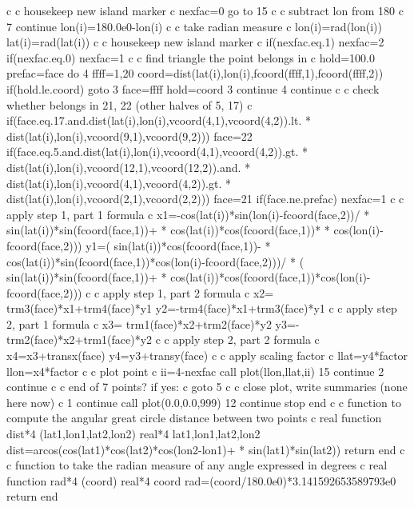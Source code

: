 c
c housekeep new island marker
c
      nexfac=0
      go to 15
c
c subtract lon from 180
c
7     continue
      lon(i)=180.0e0-lon(i)
c
c take radian measure
c
      lon(i)=rad(lon(i))
      lat(i)=rad(lat(i))
c
c housekeep new island marker
c
      if(nexfac.eq.1) nexfac=2
      if(nexfac.eq.0) nexfac=1
c
c find triangle the point belongs in
c
      hold=100.0
      prefac=face
      do 4 ffff=1,20
      coord=dist(lat(i),lon(i),fcoord(ffff,1),fcoord(ffff,2))
      if(hold.le.coord) goto 3
      face=ffff
      hold=coord
3     continue
4     continue
c
c check whether belongs in 21, 22 (other halves of 5, 17)
c
      if(face.eq.17.and.dist(lat(i),lon(i),vcoord(4,1),vcoord(4,2)).lt.
     *  dist(lat(i),lon(i),vcoord(9,1),vcoord(9,2))) face=22
      if(face.eq.5.and.dist(lat(i),lon(i),vcoord(4,1),vcoord(4,2)).gt.
     *  dist(lat(i),lon(i),vcoord(12,1),vcoord(12,2)).and.
     *  dist(lat(i),lon(i),vcoord(4,1),vcoord(4,2)).gt.
     *  dist(lat(i),lon(i),vcoord(2,1),vcoord(2,2))) face=21
      if(face.ne.prefac) nexfac=1
c
c apply step 1, part 1 formula
c
      x1=-cos(lat(i))*sin(lon(i)-fcoord(face,2))/
     *    sin(lat(i))*sin(fcoord(face,1))+
     *    cos(lat(i))*cos(fcoord(face,1))*
     *    cos(lon(i)-fcoord(face,2)))
      y1=( sin(lat(i))*cos(fcoord(face,1))-
     *     cos(lat(i))*sin(fcoord(face,1))*cos(lon(i)-fcoord(face,2)))/
     *   ( sin(lat(i))*sin(fcoord(face,1))+
     *     cos(lat(i))*cos(fcoord(face,1))*cos(lon(i)-fcoord(face,2)))
c
c apply step 1, part 2 formula
c
      x2= trm3(face)*x1+trm4(face)*y1
      y2=-trm4(face)*x1+trm3(face)*y1
c
c apply step 2, part 1 formula
c
      x3= trm1(face)*x2+trm2(face)*y2
      y3=-trm2(face)*x2+trm1(face)*y2
c
c apply step 2, part 2 formula
c
      x4=x3+transx(face)
      y4=y3+transy(face)
c
c apply scaling factor
c
      llat=y4*factor
      llon=x4*factor
c
c plot point
c
      ii=4-nexfac
      call plot(llon,llat,ii)
15    continue
2     continue
c
c end of 7 points? if yes:
c
      goto 5
c
c close plot, write summaries (none here now)
c
1     continue
      call plot(0.0,0.0,999)
12    continue
      stop
      end
c
c function to compute the angular great circle distance between two points
c
      real function dist*4 (lat1,lon1,lat2,lon2)
      real*4 lat1,lon1,lat2,lon2
      dist=arcos(cos(lat1)*cos(lat2)*cos(lon2-lon1)+
     *           sin(lat1)*sin(lat2))
      return
      end
c
c function to take the radian measure of any angle expressed in degrees
c
      real function rad*4 (coord)
      real*4 coord
      rad=(coord/180.0e0)*3.141592653589793e0
      return
      end
\bye
